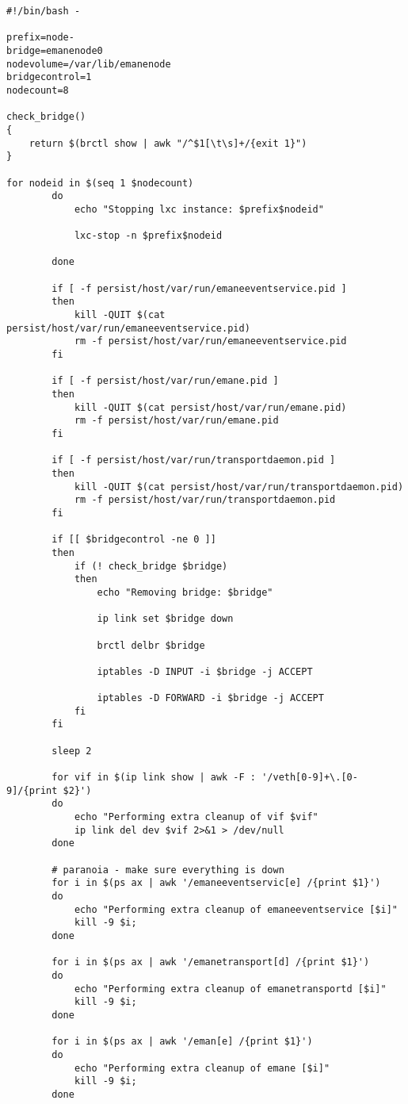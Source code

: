 \lstset{language=BASH}
\begin{lstlisting}
#!/bin/bash -

prefix=node-
bridge=emanenode0
nodevolume=/var/lib/emanenode
bridgecontrol=1
nodecount=8

check_bridge()
{
    return $(brctl show | awk "/^$1[\t\s]+/{exit 1}") 
}

for nodeid in $(seq 1 $nodecount)
        do
            echo "Stopping lxc instance: $prefix$nodeid"

            lxc-stop -n $prefix$nodeid

        done
        
        if [ -f persist/host/var/run/emaneeventservice.pid ]
        then
            kill -QUIT $(cat persist/host/var/run/emaneeventservice.pid)
            rm -f persist/host/var/run/emaneeventservice.pid
        fi
                
        if [ -f persist/host/var/run/emane.pid ]
        then
            kill -QUIT $(cat persist/host/var/run/emane.pid)
            rm -f persist/host/var/run/emane.pid
        fi

        if [ -f persist/host/var/run/transportdaemon.pid ]
        then
            kill -QUIT $(cat persist/host/var/run/transportdaemon.pid)
            rm -f persist/host/var/run/transportdaemon.pid
        fi
        
        if [[ $bridgecontrol -ne 0 ]]
        then
            if (! check_bridge $bridge)
            then
                echo "Removing bridge: $bridge"
                
                ip link set $bridge down
                
                brctl delbr $bridge
                
                iptables -D INPUT -i $bridge -j ACCEPT
                
                iptables -D FORWARD -i $bridge -j ACCEPT
            fi
        fi

        sleep 2

        for vif in $(ip link show | awk -F : '/veth[0-9]+\.[0-9]/{print $2}')
        do
            echo "Performing extra cleanup of vif $vif"
            ip link del dev $vif 2>&1 > /dev/null
        done

        # paranoia - make sure everything is down
        for i in $(ps ax | awk '/emaneeventservic[e] /{print $1}')
        do
            echo "Performing extra cleanup of emaneeventservice [$i]"
            kill -9 $i;
        done

        for i in $(ps ax | awk '/emanetransport[d] /{print $1}')
        do
            echo "Performing extra cleanup of emanetransportd [$i]"
            kill -9 $i;
        done    

        for i in $(ps ax | awk '/eman[e] /{print $1}')
        do
            echo "Performing extra cleanup of emane [$i]"
            kill -9 $i;
        done  
\end{lstlisting}

